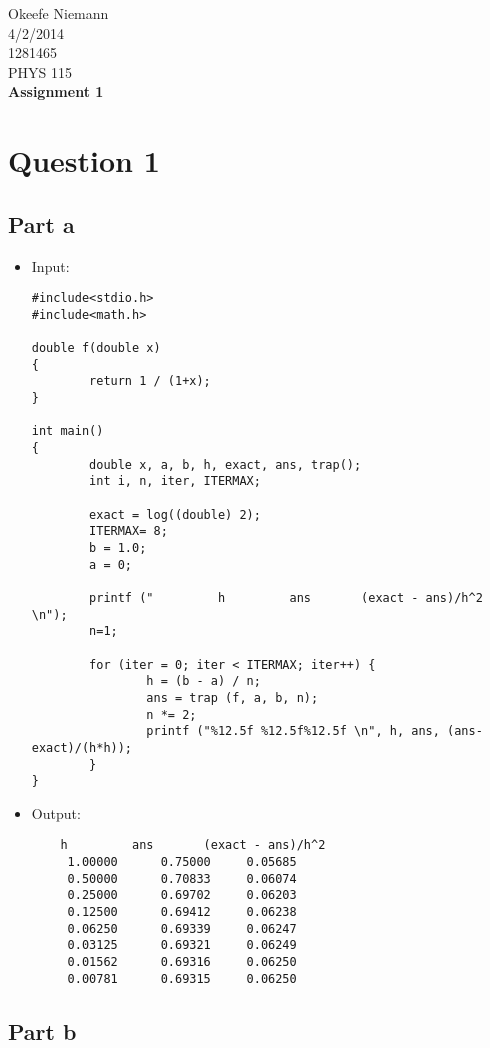 \documentclass[10pt]{article}
\begin{document}
 
\begin{center}
\large
\hfill Okeefe Niemann\\
\hfill 4/2/2014\\
\hfill 1281465\\
\hfill PHYS 115 \\
\LARGE \textbf{Assignment 1}\\
\end{center}
\normalsize
\section{Question 1}
\subsection{Part a}

\begin{itemize}
\item Input:
\begin{verbatim}
#include<stdio.h>
#include<math.h>

double f(double x)
{
        return 1 / (1+x);
}

int main()
{
        double x, a, b, h, exact, ans, trap();
        int i, n, iter, ITERMAX;
        
        exact = log((double) 2);
        ITERMAX= 8;
        b = 1.0;
        a = 0;
        
        printf ("         h         ans       (exact - ans)/h^2 \n");
        n=1;

        for (iter = 0; iter < ITERMAX; iter++) {
                h = (b - a) / n;
                ans = trap (f, a, b, n);
                n *= 2;
                printf ("%12.5f %12.5f%12.5f \n", h, ans, (ans-exact)/(h*h));
        }
}
\end{verbatim}
\item Output:
\begin{verbatim}
    h         ans       (exact - ans)/h^2 
     1.00000      0.75000     0.05685 
     0.50000      0.70833     0.06074 
     0.25000      0.69702     0.06203 
     0.12500      0.69412     0.06238 
     0.06250      0.69339     0.06247 
     0.03125      0.69321     0.06249 
     0.01562      0.69316     0.06250 
     0.00781      0.69315     0.06250 
\end{verbatim}
\end{itemize}

\subsection{Part b}
\end{document}
